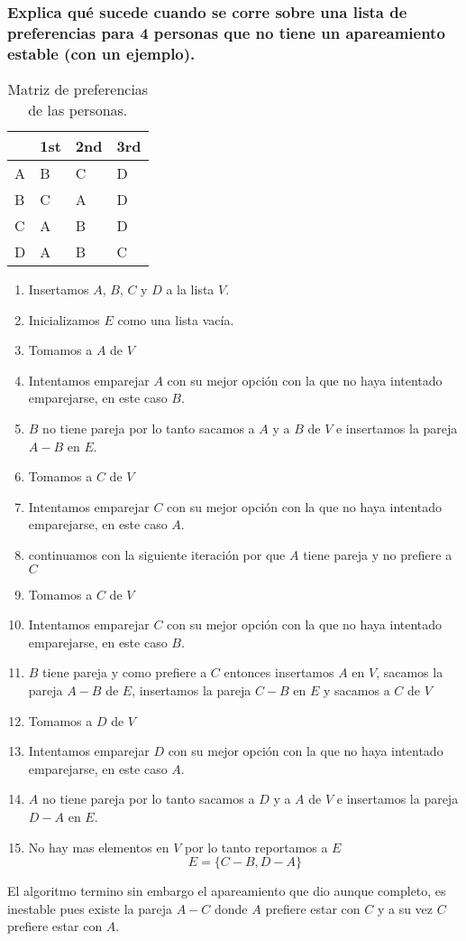\documentclass[12pt]{article}
\begin{document}
\subsubsection{Explica qué sucede cuando se corre sobre una lista de preferencias para 4 personas que no tiene un apareamiento estable (con un ejemplo).}
\begin{table}[h!]
	\begin{center}
		\label{tab:fp_advantages_disadvantages}
		\begin{tabular}{C{3cm} ||C{3cm} |C{3cm} |C{3cm} |}
			\textbf{} & \textbf{1st} & \textbf{2nd} & \textbf{3rd} \\
			\hline
			A & B & C & D\\
			\hline
			B & C & A & D\\
			\hline
			C & A & B & D\\
			\hline
			D & A & B & C\\
		\end{tabular}
		\caption{Matriz de preferencias de las personas.}
	\end{center}
\end{table}
\begin{enumerate}
	\item Insertamos $A$, $B$, $C$ y $D$ a la lista $V$.
	\item Inicializamos $E$ como una lista vacía.
	\item Tomamos a $A$ de $V$
	\item Intentamos emparejar $A$ con su mejor opción con la que no haya intentado emparejarse, en este caso $B$.
	\item $B$ no tiene pareja por lo tanto sacamos a $A$ y a $B$ de $V$ e insertamos la pareja $A-B$ en $E$.
	\item Tomamos a $C$ de $V$
	\item Intentamos emparejar $C$ con su mejor opción con la que no haya intentado emparejarse, en este caso $A$.
	\item continuamos con la siguiente iteración por que $A$ tiene pareja y no prefiere a $C$
	\item Tomamos a $C$ de $V$
	\item Intentamos emparejar $C$ con su mejor opción con la que no haya intentado emparejarse, en este caso $B$.
	\item $B$ tiene pareja y como prefiere a $C$ entonces insertamos $A$ en $V$, sacamos la pareja $A-B$ de $E$, insertamos la pareja $C-B$ en $E$ y sacamos a $C$ de $V$
	\item Tomamos a $D$ de $V$
	\item Intentamos emparejar $D$ con su mejor opción con la que no haya intentado emparejarse, en este caso $A$.
	\item $A$ no tiene pareja por lo tanto sacamos a $D$ y a $A$ de $V$ e insertamos la pareja $D-A$ en $E$.
	\item No hay mas elementos en $V$ por lo tanto reportamos a $E$
	\begin{equation}\label{emp_la}
		E = \{ C-B, D-A \}
	\end{equation}
\end{enumerate}
El algoritmo termino sin embargo el apareamiento que dio aunque completo, es inestable pues existe la pareja $A-C$ donde $A$ prefiere estar con $C$ y a su vez $C$ prefiere estar con $A$.
\end{document}
